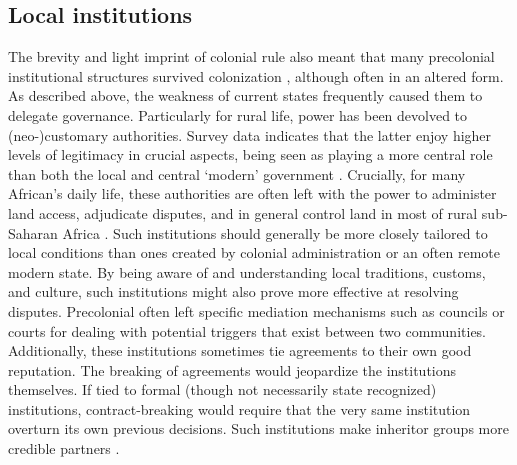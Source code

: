 \subsection{Local institutions} \label{Local institutions}

The brevity and light imprint of colonial rule also meant that many precolonial
institutional structures survived colonization \citep{Wig2016, Wig2018},
although often in an altered form. As described above, the weakness of current
states frequently caused them to delegate governance. Particularly for rural
life, power has been devolved to (neo-)customary authorities. Survey data
indicates that the latter enjoy higher levels of legitimacy in crucial aspects,
being seen as playing a more central role than both the local and central
`modern' government \citep[360]{Logan_2013}. Crucially, for many African's daily
life, these authorities are often left with the power to administer land access,
adjudicate disputes, and in general control land in most of rural sub-Saharan
Africa \citep{englebert2013inside, boone2014property, posner2005institutions}.
Such institutions should generally be more closely tailored to local conditions
than ones created by colonial administration or an often remote modern state. By
being aware of and understanding local traditions, customs, and culture, such
institutions might also prove more effective at resolving disputes. Precolonial
often left specific mediation mechanisms such as councils or courts for dealing
with potential triggers that exist between two communities. Additionally, these
institutions sometimes tie agreements to their own good reputation. The breaking
of agreements would jeopardize the institutions themselves. If tied to formal
(though not necessarily state recognized) institutions, contract-breaking would
require that the very same institution overturn its own previous decisions. Such
institutions make inheritor groups more credible partners \citep{Wig2018}. 


